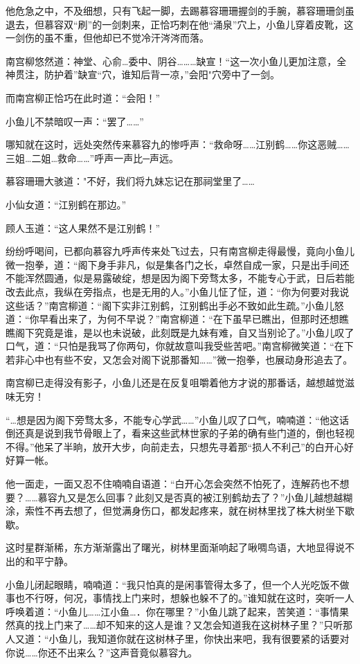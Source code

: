 \documentclass[12pt,oneside]{book}
\begin{document}
他危急之中，不及细想，只有飞起一脚，去踢慕容珊珊握剑的手腕，慕容珊珊剑虽退去，但慕容双``刷''的一剑刺来，正恰巧刺在他``涌泉''穴上，小鱼儿穿着皮靴，这一剑伤的虽不重，但他却已不觉冷汗涔涔而落。

南宫柳悠然道：神堂、心俞\ldots 委中、阴谷\ldots\ldots\ldots 缺宣！``这一次小鱼儿更加注意，全神贯注，防护着''缺宣``穴，谁知后背一凉，''会阳"穴旁中了一剑。

而南宫柳正恰巧在此时道：``会阳！''

小鱼儿不禁暗叹一声：``罢了\ldots\ldots{}''

哪知就在这时，远处突然传来慕容九的惨呼声：``救命呀\ldots\ldots 江别鹤\ldots\ldots 你这恶贼\ldots\ldots 三姐\ldots 二姐\ldots 救命\ldots\ldots{}''呼声一声比─声远。

慕容珊珊大骇道："不好，我们将九妹忘记在那祠堂里了\ldots\ldots{}

小仙女道：``江别鹤在那边。''

顾人玉道：``这人果然不是江别鹤！''

纷纷呼喝间，已都向慕容九呼声传来处飞过去，只有南宫柳走得最慢，竟向小鱼儿微一抱拳，道：``阁下身手非凡，似是集各门之长，卓然自成一家，只是出手间还不能浑然圆通，似是易露破绽，想是因为阁下旁骛太多，不能专心于武，日后若能改去此点，我纵在旁指点，也是无用的人。''小鱼儿怔了怔，道：``你为何要对我说这些话？''南宫柳道：``阁下实非江别鹤，江别鹤出手必不致如此生疏。''小鱼儿怒道：``你早看出来了，为何不早说？''南宫柳道：``在下虽早已瞧出，但那时还想瞧瞧阁下究竟是谁，是以也未说破，此刻既是九妹有难，自又当别论了。''小鱼儿叹了口气，道：``只怕是我骂了你两句，你就故意叫我受些苦吧。''南宫柳微笑道：``在下若非心中也有些不安，又怎会对阁下说那番知\ldots\ldots{}''微一抱拳，也展动身形追去了。

南宫柳已走得没有影子，小鱼儿还是在反复咀嚼着他方才说的那番话，越想越觉滋味无穷！

``\ldots 想是因为阁下旁骛太多，不能专心学武\ldots\ldots{}''小鱼儿叹了口气，喃喃道：``他这话倒还真是说到我节骨眼上了，看来这些武林世家的子弟的确有些门道的，倒也轻视不得。''他呆了半晌，放开大步，向前走去，只想先寻着那``损人不利己''的白开心好好算一帐。

他一面走，一面又忍不住喃喃自语道：``白开心怎会突然不怕死了，连解药也不想要？\ldots\ldots 慕容九又是怎么回事？此刻又是否真的被江别鹤劫去了？''小鱼儿越想越糊涂，索性不再去想了，但觉满身伤口，都发起疼来，就在树林里找了株大树坐下歇歇。

这时星群渐稀，东方渐渐露出了曙光，树林里面渐响起了啾啁鸟语，大地显得说不出的和平宁静。

小鱼儿闭起眼睛，喃喃道：``我只怕真的是闲事管得太多了，但一个人光吃饭不做事也不行呀，何况，事情找上门来时，想躲也躲不了的。''谁知就在这时，突听一人呼唤着道：``小鱼儿\ldots\ldots 江小鱼\ldots．你在哪里？''小鱼儿跳了起来，苦笑道：``事情果然真的找上门来了\ldots\ldots 却不知来的这人是谁？又怎会知道我在这树林子里？''只听那人又道：``小鱼儿，我知道你就在这树林子里，你快出来吧，我有很要紧的话要对你说\ldots\ldots 你还不出来么？''这声音竟似慕容九。
\end{document}
